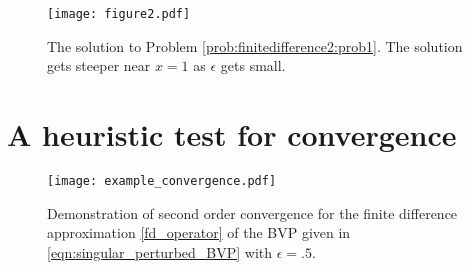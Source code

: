 \begin{figure}[h]
\centering
\texttt{[image: figure2.pdf]}
\caption{The solution to Problem \ref{prob:finitedifference2:prob1}.
The solution gets steeper near $x = 1$ as $\epsilon $ gets small.}
\end{figure}


\begin{comment}
\begin{lstlisting}
import numpy as np
from scipy.sparse import spdiags
from scipy.sparse.linalg import spsolve
import matplotlib.pyplot as plt

def bvp(func, epsilon, alpha, beta, N):
	a,b = 0., 1. 	# Interval for the BVP
	h = (b-a)/N 	# The length of each subinterval
	
	# Initialize and define the vector F on the right
	F = np.empty(N-1.)			
	F[0] = func(a+1.*h)-alpha*(epsilon+h/2.)*h**(-2.)
	F[N-2] = func(a+(N-1)*h)-beta*(epsilon-h/2.)*h**(-2.)
	for j in xrange(1,N-2):
		F[j] = func(a + (j+1)*h)
		
	# Here we define the arrays that will go on the diagonals of A
	data = np.empty((3,N-1))
	data[0,:] = -2.*epsilon*np.ones((1,N-1)) # main diagonal
	data[1,:]  = (epsilon+h/2.)*np.ones((1,N-1))  	 # off-diagonals
	data[2,:] = (epsilon-h/2.)*np.ones((1,N-1))
	# Next we specify on which diagonals they will be placed, and create A
	diags = np.array([0,-1,1])
	A=h**(-2.)*spdiags(data,diags,N-1,N-1).asformat('csr')
	
	U = np.empty(N+1)
	U[1:-1] = spsolve(A,F)
	U[0], U[-1] = alpha, beta
	return np.linspace(a,b,N+1), U

x, y = bvp(lambda x:-1., epsilon=.05,alpha=1, beta=3, N=400)
plt.plot(x,y,'-k',linewidth=2.0)
plt.show()

\end{lstlisting}
\end{comment}


\section*{A heuristic test for convergence}
\begin{figure}[ht]
\centering
\texttt{[image: example\_convergence.pdf]}
\caption{Demonstration of second order convergence for the finite difference approximation \eqref{fd_operator} of the BVP given in \eqref{eqn:singular_perturbed_BVP} with $\epsilon = .5$. } \label{fig:finitedifference2}
\end{figure}

